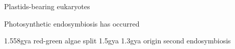 Plastids-bearing eukaryotes 






Photosynthetic endosymbiosis has occurred 




1.558gya 
red-green algae split 1.5gya
1.3gya origin second endosymbiosis \citep{Yoon2004}
















